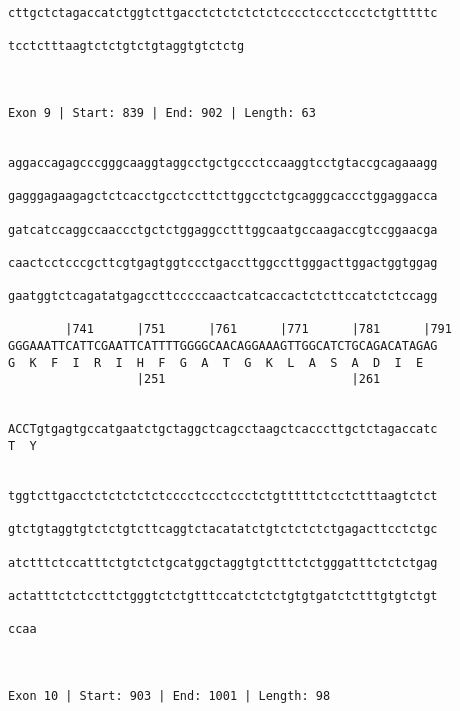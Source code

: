 \documentclass{article}
\begin{document}
\begin{Verbatim}
cttgctctagaccatctggtcttgacctctctctctctcccctccctccctctgtttttc
                                                            
tcctctttaagtctctgtctgtaggtgtctctg
                                 
                                 
 
Exon 9 | Start: 839 | End: 902 | Length: 63


aggaccagagcccgggcaaggtaggcctgctgccctccaaggtcctgtaccgcagaaagg
                                                            
gagggagaagagctctcacctgcctccttcttggcctctgcagggcaccctggaggacca
                                                            
gatcatccaggccaaccctgctctggaggcctttggcaatgccaagaccgtccggaacga
                                                            
caactcctcccgcttcgtgagtggtccctgaccttggccttgggacttggactggtggag
                                                            
gaatggtctcagatatgagccttcccccaactcatcaccactctcttccatctctccagg
                                                            
        |741      |751      |761      |771      |781      |791
GGGAAATTCATTCGAATTCATTTTGGGGCAACAGGAAAGTTGGCATCTGCAGACATAGAG
G  K  F  I  R  I  H  F  G  A  T  G  K  L  A  S  A  D  I  E  
                  |251                          |261        
  
                                                            
ACCTgtgagtgccatgaatctgctaggctcagcctaagctcacccttgctctagaccatc
T  Y                                                        
                                                            
  
tggtcttgacctctctctctctcccctccctccctctgtttttctcctctttaagtctct
                                                            
gtctgtaggtgtctctgtcttcaggtctacatatctgtctctctctgagacttcctctgc
                                                            
atctttctccatttctgtctctgcatggctaggtgtctttctctgggatttctctctgag
                                                            
actatttctctccttctgggtctctgtttccatctctctgtgtgatctctttgtgtctgt
                                                            
ccaa
    
    
 
Exon 10 | Start: 903 | End: 1001 | Length: 98



\end{Verbatim}
\end{document}
